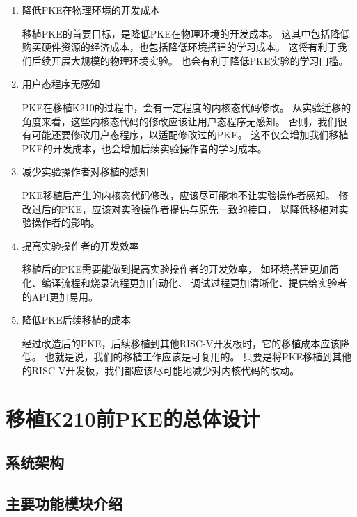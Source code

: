 \begin{enumerate}

    \item 降低PKE在物理环境的开发成本
    
    移植PKE的首要目标，是降低PKE在物理环境的开发成本。
    这其中包括降低购买硬件资源的经济成本，也包括降低环境搭建的学习成本。
    这将有利于我们后续开展大规模的物理环境实验。
    也会有利于降低PKE实验的学习门槛。

    \item 用户态程序无感知
    
    PKE在移植K210的过程中，会有一定程度的内核态代码修改。
    从实验迁移的角度来看，这些内核态代码的修改应该让用户态程序无感知。
    否则，我们很有可能还要修改用户态程序，以适配修改过的PKE。
    这不仅会增加我们移植PKE的开发成本，也会增加后续实验操作者的学习成本。

    \item 减少实验操作者对移植的感知
    
    PKE移植后产生的内核态代码修改，应该尽可能地不让实验操作者感知。
    修改过后的PKE，应该对实验操作者提供与原先一致的接口，
    以降低移植对实验操作者的影响。

    \item 提高实验操作者的开发效率
    
    移植后的PKE需要能做到提高实验操作者的开发效率，
    如环境搭建更加简化、编译流程和烧录流程更加自动化、
    调试过程更加清晰化、提供给实验者的API更加易用。
    
    \item 降低PKE后续移植的成本

    经过改造后的PKE，后续移植到其他RISC-V开发板时，它的移植成本应该降低。
    也就是说，我们的移植工作应该是可复用的。
    只要是将PKE移植到其他的RISC-V开发板，我们都应该尽可能地减少对内核代码的改动。
    
\end{enumerate}

\section{移植K210前PKE的总体设计}

\subsection{系统架构}

\subsection{主要功能模块介绍}


